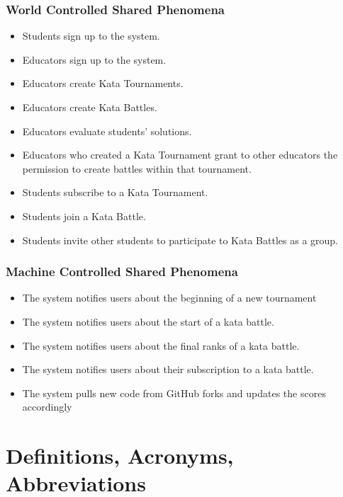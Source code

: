 \documentclass[11pt]{report}
\begin{document}
            \subsubsection{World Controlled Shared Phenomena}
                \begin{itemize}
                    \item [$S01$] Students sign up to the system.
                    \item [$S02$] Educators sign up to the system.
                    \item [$S03$] Educators create Kata Tournaments.
                    \item [$S04$] Educators create Kata Battles.
                    \item [$S05$] Educators evaluate students' solutions.
                    \item [$S06$] Educators who created a Kata Tournament grant to other educators the permission to create battles within that tournament.
                    \item [$S07$] Students subscribe to a Kata Tournament.
                    \item [$S08$] Students join a Kata Battle.
                    \item [$S09$] Students invite other students to participate to Kata Battles as a group.
                \end{itemize}
            \subsubsection{Machine Controlled Shared Phenomena}
                \begin{itemize}
                    \item [$M01$] The system notifies users about the beginning of a new tournament
                    \item [$M02$] The system notifies users about the start of a kata battle. 
                    \item [$M03$] The system notifies users about the final ranks of a kata battle.
                    \item [$M04$] The system notifies users about their subscription to a kata battle.
                    \item [$M05$] The system pulls new code from GitHub forks and updates the scores accordingly
                \end{itemize}
    \section{Definitions, Acronyms, Abbreviations}
\end{document}
